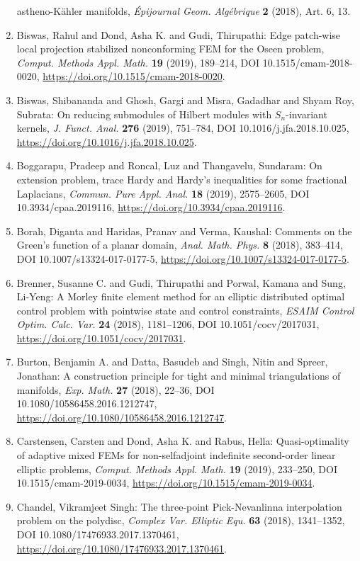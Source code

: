 \begin{enumerate}
astheno-{K}\"{a}hler manifolds, \emph{\'{E}pijournal Geom. Alg\'{e}brique} {\bf 2} (2018), Art. 6, 13.
\item Biswas, Rahul and Dond, Asha K. and Gudi, Thirupathi: Edge patch-wise local projection stabilized nonconforming
{FEM} for the {O}seen problem, \emph{Comput. Methods Appl. Math.} {\bf 19} (2019), 189--214, DOI 10.1515/cmam-2018-0020, \url{https://doi.org/10.1515/cmam-2018-0020}.
\item Biswas, Shibananda and Ghosh, Gargi and Misra, Gadadhar and
Shyam Roy, Subrata: On reducing submodules of {H}ilbert modules with
{${S}_n$}-invariant kernels, \emph{J. Funct. Anal.} {\bf 276} (2019), 751--784, DOI 10.1016/j.jfa.2018.10.025, \url{https://doi.org/10.1016/j.jfa.2018.10.025}.
\item Boggarapu, Pradeep and Roncal, Luz and Thangavelu, Sundaram: On extension problem, trace {H}ardy and {H}ardy's inequalities
for some fractional {L}aplacians, \emph{Commun. Pure Appl. Anal.} {\bf 18} (2019), 2575--2605, DOI 10.3934/cpaa.2019116, \url{https://doi.org/10.3934/cpaa.2019116}.
\item Borah, Diganta and Haridas, Pranav and Verma, Kaushal: Comments on the {G}reen's function of a planar domain, \emph{Anal. Math. Phys.} {\bf 8} (2018), 383--414, DOI 10.1007/s13324-017-0177-5, \url{https://doi.org/10.1007/s13324-017-0177-5}.
\item Brenner, Susanne C. and Gudi, Thirupathi and Porwal, Kamana
and Sung, Li-Yeng: A {M}orley finite element method for an elliptic distributed
optimal control problem with pointwise state and control
constraints, \emph{ESAIM Control Optim. Calc. Var.} {\bf 24} (2018), 1181--1206, DOI 10.1051/cocv/2017031, \url{https://doi.org/10.1051/cocv/2017031}.
\item Burton, Benjamin A. and Datta, Basudeb and Singh, Nitin and
Spreer, Jonathan: A construction principle for tight and minimal triangulations
of manifolds, \emph{Exp. Math.} {\bf 27} (2018), 22--36, DOI 10.1080/10586458.2016.1212747, \url{https://doi.org/10.1080/10586458.2016.1212747}.
\item Carstensen, Carsten and Dond, Asha K. and Rabus, Hella: Quasi-optimality of adaptive mixed {FEM}s for non-selfadjoint
indefinite second-order linear elliptic problems, \emph{Comput. Methods Appl. Math.} {\bf 19} (2019), 233--250, DOI 10.1515/cmam-2019-0034, \url{https://doi.org/10.1515/cmam-2019-0034}.
\item Chandel, Vikramjeet Singh: The three-point {P}ick-{N}evanlinna interpolation problem on
the polydisc, \emph{Complex Var. Elliptic Equ.} {\bf 63} (2018), 1341--1352, DOI 10.1080/17476933.2017.1370461, \url{https://doi.org/10.1080/17476933.2017.1370461}.

\end{enumerate}
